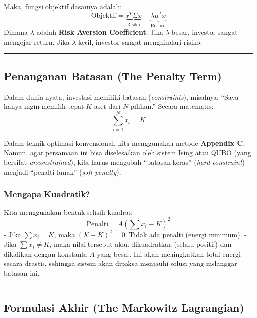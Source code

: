 Maka, fungsi objektif dasarnya adalah: \[ \text{Objektif} = \underbrace{x^T \Sigma x}_{\text{Risiko}} - \underbrace{\lambda \mu^T x}_{\text{Return}} \] Dimana \(\lambda\) adalah \textbf{Risk Aversion Coefficient}. Jika \(\lambda\) besar, investor sangat mengejar return. Jika \(\lambda\) kecil, investor sangat menghindari risiko.

\begin{center}\rule{0.5\linewidth}{0.5pt}\end{center}

\hypertarget{penanganan-batasan-the-penalty-term}{%
\subsection{Penanganan Batasan (The Penalty Term)}\label{penanganan-batasan-the-penalty-term}}

Dalam dunia nyata, investasi memiliki batasan (\emph{constraints}), misalnya: ``Saya hanya ingin memilih tepat \(K\) aset dari \(N\) pilihan.'' Secara matematis: \[ \sum_{i=1}^N x_i = K \]

Dalam teknik optimasi konvensional, kita menggunakan metode \textbf{Appendix C}. Namun, agar persamaan ini bisa diselesaikan oleh sistem Ising atau QUBO (yang bersifat \emph{unconstrained}), kita harus mengubah ``batasan keras'' (\emph{hard constraint}) menjadi ``penalti lunak'' (\emph{soft penalty}).

\hypertarget{mengapa-kuadratik}{%
\subsubsection{Mengapa Kuadratik?}\label{mengapa-kuadratik}}

Kita menggunakan bentuk selisih kuadrat: \[ \text{Penalti} = A \left( \sum x_i - K \right)^2 \] - Jika \(\sum x_i = K\), maka \((K-K)^2 = 0\). Tidak ada penalti (energi minimum). - Jika \(\sum x_i \neq K\), maka nilai tersebut akan dikuadratkan (selalu positif) dan dikalikan dengan konstanta \(A\) yang besar. Ini akan meningkatkan total energi secara drastis, sehingga sistem akan dipaksa menjauhi solusi yang melanggar batasan ini.

\begin{center}\rule{0.5\linewidth}{0.5pt}\end{center}

\hypertarget{formulasi-akhir-the-markowitz-lagrangian}{%
\subsection{Formulasi Akhir (The Markowitz Lagrangian)}\label{formulasi-akhir-the-markowitz-lagrangian}}

